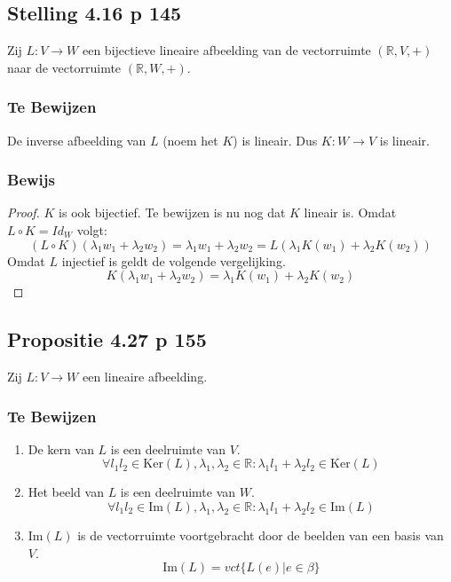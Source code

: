 \documentclass[lineaire_algebra_oplossingen.tex]{subfiles}
\begin{document}
\subsection{Stelling 4.16 p 145}
\label{4.16}
Zij $L:V\rightarrow W$ een bijectieve lineaire afbeelding van de vectorruimte $(\mathbb{R},V,+)$ naar de vectorruimte $(\mathbb{R},W,+)$.
\subsubsection*{Te Bewijzen}
De inverse afbeelding van $L$ (noem het $K$) is lineair. Dus $K : W \rightarrow V$ is lineair.
\subsubsection*{Bewijs}
\begin{proof}
$K$ is ook bijectief. Te bewijzen is nu nog dat $K$ lineair is. Omdat $L \circ K = \textit{Id}_W$ volgt:
\[
(L\circ K)(\lambda_1w_1 + \lambda_2w_2) = \lambda_1w_1 + \lambda_2w_2 = L(\lambda_1K(w_1) + \lambda_2K(w_2))
\]
Omdat $L$ injectief is geldt de volgende vergelijking.
\[
K(\lambda_1w_1 + \lambda_2w_2) = \lambda_1K(w_1) + \lambda_2K(w_2)
\]
\end{proof}


\subsection{Propositie 4.27 p 155}
\label{4.27}
Zij $L: V\rightarrow W$ een lineaire afbeelding.

\subsubsection*{Te Bewijzen}
\begin{enumerate}
\item De kern van $L$ is een deelruimte van $V$.
\[
\forall l_1l_2\in \text{Ker}(L), \lambda_1,\lambda_2\in \mathbb{R}: \lambda_1l_1+\lambda_2l_2 \in \text{Ker}(L)
\]

\item Het beeld van $L$ is een deelruimte van $W$.
\[
\forall l_1l_2\in \text{Im}(L), \lambda_1,\lambda_2\in \mathbb{R}: \lambda_1l_1+\lambda_2l_2 \in \text{Im}(L)
\]

\item $\text{Im}(L)$ is de vectorruimte voortgebracht door de beelden van een basis van $V$.
\[
\text{Im}(L) = vct\{L(e)|e\in \beta\}
\]
\end{enumerate}
\end{document}
